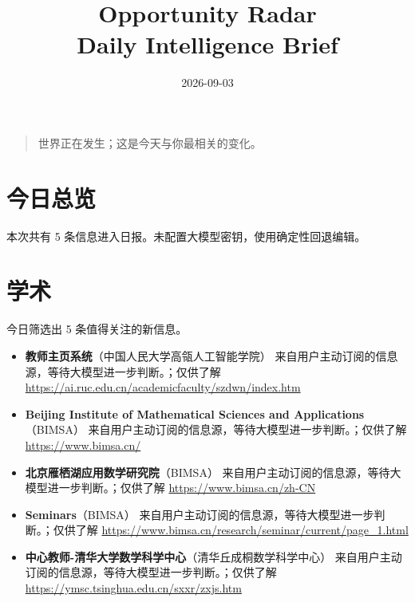 \documentclass[11pt]{ctexart}
\title{Opportunity Radar\\Daily Intelligence Brief}
\date{2026-09-03}
\begin{document}
\maketitle
\begin{quote}\Large 世界正在发生；这是今天与你最相关的变化。\end{quote}
\section*{今日总览}
本次共有 5 条信息进入日报。未配置大模型密钥，使用确定性回退编辑。
\section*{学术}
今日筛选出 5 条值得关注的新信息。
\begin{itemize}
\item \textbf{教师主页系统}（中国人民大学高瓴人工智能学院） 来自用户主动订阅的信息源，等待大模型进一步判断。；仅供了解 \url{https://ai.ruc.edu.cn/academicfaculty/szdwn/index.htm}
\item \textbf{Beijing Institute of Mathematical Sciences and Applications}（BIMSA） 来自用户主动订阅的信息源，等待大模型进一步判断。；仅供了解 \url{https://www.bimsa.cn/}
\item \textbf{北京雁栖湖应用数学研究院}（BIMSA） 来自用户主动订阅的信息源，等待大模型进一步判断。；仅供了解 \url{https://www.bimsa.cn/zh-CN}
\item \textbf{Seminars}（BIMSA） 来自用户主动订阅的信息源，等待大模型进一步判断。；仅供了解 \url{https://www.bimsa.cn/research/seminar/current/page_1.html}
\item \textbf{中心教师-清华大学数学科学中心}（清华丘成桐数学科学中心） 来自用户主动订阅的信息源，等待大模型进一步判断。；仅供了解 \url{https://ymsc.tsinghua.edu.cn/sxxr/zxjs.htm}
\end{itemize}
\end{document}
